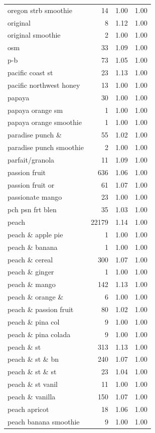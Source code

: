 \begin{table}
\begin{tabular}{lrrr}
oregon strb smoothie & 14 & 1.00 & 1.00 \\
original & 8 & 1.12 & 1.00 \\
original smoothie & 2 & 1.00 & 1.00 \\
osm & 33 & 1.09 & 1.00 \\
p-b & 73 & 1.05 & 1.00 \\
pacific coast st & 23 & 1.13 & 1.00 \\
pacific northwest honey & 13 & 1.00 & 1.00 \\
papaya & 30 & 1.00 & 1.00 \\
papaya orange sm & 1 & 1.00 & 1.00 \\
papaya orange smoothie & 1 & 1.00 & 1.00 \\
paradise punch \& & 55 & 1.02 & 1.00 \\
paradise punch smoothie & 2 & 1.00 & 1.00 \\
parfait/granola & 11 & 1.09 & 1.00 \\
passion fruit & 636 & 1.06 & 1.00 \\
passion fruit or & 61 & 1.07 & 1.00 \\
passionate mango & 23 & 1.00 & 1.00 \\
pch psn frt blen & 35 & 1.03 & 1.00 \\
peach & 22179 & 1.14 & 1.00 \\
peach \& apple pie & 1 & 1.00 & 1.00 \\
peach \& banana & 1 & 1.00 & 1.00 \\
peach \& cereal & 300 & 1.07 & 1.00 \\
peach \& ginger & 1 & 1.00 & 1.00 \\
peach \& mango & 142 & 1.13 & 1.00 \\
peach \& orange \& & 6 & 1.00 & 1.00 \\
peach \& passion fruit & 80 & 1.02 & 1.00 \\
peach \& pina col & 9 & 1.00 & 1.00 \\
peach \& pina colada & 9 & 1.00 & 1.00 \\
peach \& st & 313 & 1.13 & 1.00 \\
peach \& st \& bn & 240 & 1.07 & 1.00 \\
peach \& st \& st & 23 & 1.04 & 1.00 \\
peach \& st vanil & 11 & 1.00 & 1.00 \\
peach \& vanilla & 150 & 1.07 & 1.00 \\
peach apricot & 18 & 1.06 & 1.00 \\
peach banana smoothie & 9 & 1.00 & 1.00 \\

\end{tabular}
\end{table}
